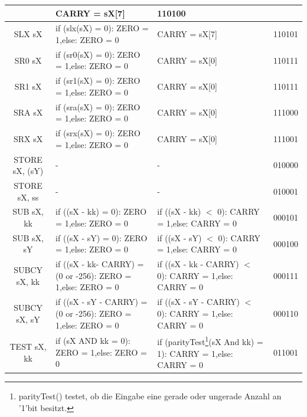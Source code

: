 \documentclass{scrartcl}
\begin{document}
\begin{longtable}{||c|p{6cm}|p{6cm}|c||}
    & CARRY = sX[7] & 110100 \\ \hline
    SLX sX & if (slx(sX) = 0): ZERO = 1,\newline else: ZERO = 0
    & CARRY = sX[7] & 110101 \\ \hline
    SR0 sX & if (sr0(sX) = 0): ZERO = 1,\newline else: ZERO = 0
    & CARRY = sX[0] & 110111 \\ \hline
    SR1 sX & if (sr1(sX) = 0): ZERO = 1,\newline else: ZERO = 0
    & CARRY = sX[0] & 110111 \\ \hline
    SRA sX & if (sra(sX) = 0): ZERO = 1,\newline else: ZERO = 0
    & CARRY = sX[0] & 111000 \\ \hline
    SRX sX & if (srx(sX) = 0): ZERO = 1,\newline else: ZERO = 0
    & CARRY = sX[0] & 111001 \\ \hline
    STORE sX, (sY) & - & - & 010000 \\ \hline
    STORE sX, ss & - & - & 010001 \\ \hline
    SUB sX, kk & if ((sX - kk) = 0): ZERO = 1,\newline else: ZERO = 0
    & if ((sX - kk) $<$ 0): CARRY = 1,\newline else: CARRY = 0 & 000101 \\ \hline
    SUB sX, sY & if ((sX - sY) = 0): ZERO = 1,\newline else: ZERO = 0
    & if ((sX - sY) $<$ 0): CARRY = 1,\newline else: CARRY = 0 & 000100 \\ \hline
    SUBCY sX, kk & if ((sX - kk- CARRY) = (0 or -256): ZERO = 1,\newline else: ZERO = 0
    & if ((sX - kk - CARRY) $<$ 0): CARRY = 1,\newline else: CARRY = 0 & 000111 \\ \hline
    SUBCY sX, sY & if ((sX - sY - CARRY) = (0 or -256): ZERO = 1,\newline else: ZERO = 0
    & if ((sX - sY - CARRY) $<$ 0): CARRY = 1,\newline else: CARRY = 0 & 000110 \\ \hline
    TEST sX, kk & if (sX AND kk = 0): ZERO = 1,\newline else: ZERO = 0
    & if (parityTest\footnote{parityTest() testet, ob die Eingabe eine gerade oder ungerade Anzahl an '1'bit besitzt.}(sX And kk) = 1): CARRY = 1,\newline else: CARRY = 0 & 011001 \\ \hline

\end{longtable}
\end{document}
